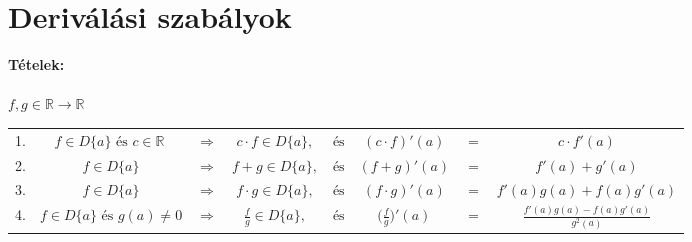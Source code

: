 \documentclass[10pt,a4paper]{article}
\begin{document}
\section{Deriválási szabályok}
\textbf{Tételek:} \\ \\
$f,g \in \mathbb{R} \rightarrow \mathbb{R}$ \\

\begin{tabular}{c c c c c c c c}
1. & $ f\in D\{a\} \text{ és } c \in \mathbb{R} \:$ & $\Longrightarrow$& $ c\cdot f \in D\{a\}, $ & $\text{és}$ & $ (c \cdot f)'(a) $&$=$&$c\cdot f'(a) $ \\
2. & $f\in D\{a\} $&$\Longrightarrow$ &$ f+g\in D\{a\},$ &$ \text{és}$&$ (f+g)'(a) $&$=$&$f'(a) + g'(a)$   \\
3. & $f\in D\{a\}$ & $\Longrightarrow $ & $ f\cdot g \in D\{a\}, $&$  \text{és} $&$ (f\cdot g)'(a) $&$=$&$f'(a)g(a)+ f(a)g'(a)$ \\
4. & $f\in D\{a\} \text{ és }  g(a)\neq 0 $&$\Longrightarrow$&$  \frac{f}{g} \in D\{a\},$&$  \text{és} $&$ \Big(\frac{f}{g} \Big)' (a)$&$ =$&$ \frac{f'(a)g(a)-f(a)g'(a)}{g^2(a)}$
\end{tabular}
\end{document}
